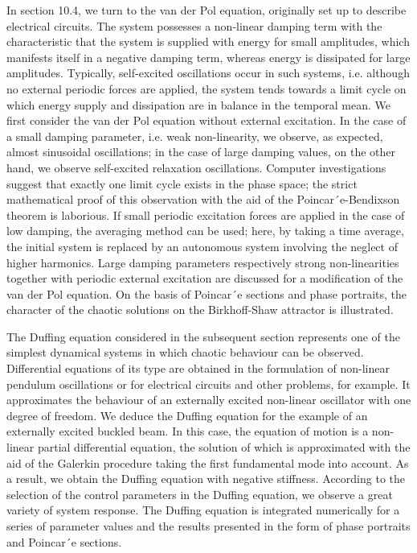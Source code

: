 \documentclass[12pt]{article}
\begin{document}
In section 10.4, we turn to the van der Pol equation, originally set up to describe
electrical circuits. The system possesses a non-linear damping term with the
characteristic that the system is supplied with energy for small amplitudes, which
manifests itself in a negative damping term, whereas energy is dissipated for large
amplitudes. Typically, self-excited oscillations occur in such systems, i.e. although
no external periodic forces are applied, the system tends towards a limit cycle on
which energy supply and dissipation are in balance in the temporal mean. We first
consider the van der Pol equation without external excitation. In the case of a
small damping parameter, i.e. weak non-linearity, we observe, as expected, almost
sinusoidal oscillations; in the case of large damping values, on the other hand, we
observe self-excited relaxation oscillations. Computer investigations suggest that
exactly one limit cycle exists in the phase space; the strict mathematical proof of
this observation with the aid of the Poincar´e-Bendixson theorem is laborious. If
small periodic excitation forces are applied in the case of low damping, the averaging
method can be used; here, by taking a time average, the initial system is
replaced by an autonomous system involving the neglect of higher harmonics. Large
damping parameters respectively strong non-linearities together with periodic external
excitation are discussed for a modification of the van der Pol equation. On
the basis of Poincar´e sections and phase portraits, the character of the chaotic solutions
on the Birkhoff-Shaw attractor is illustrated.

\hfill

The Duffing equation considered in the subsequent section represents one of the
simplest dynamical systems in which chaotic behaviour can be observed. Differential
equations of its type are obtained in the formulation of non-linear pendulum
oscillations or for electrical circuits and other problems, for example. It approximates
the behaviour of an externally excited non-linear oscillator with one degree of
freedom. We deduce the Duffing equation for the example of an externally excited
buckled beam. In this case, the equation of motion is a non-linear partial differential
equation, the solution of which is approximated with the aid of the Galerkin procedure
taking the first fundamental mode into account. As a result, we obtain the
Duffing equation with negative stiffness. According to the selection of the control
parameters in the Duffing equation, we observe a great variety of system response.
The Duffing equation is integrated numerically for a series of parameter values and
the results presented in the form of phase portraits and Poincar´e sections.
\end{document}

